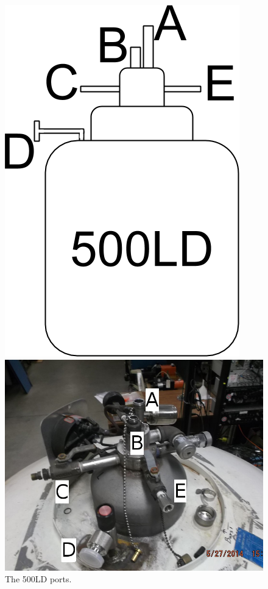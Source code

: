 \begin{figure}[!htbp]
 \centering
 \begin{minipage}{.35\textwidth}
 \includegraphics[width=\textwidth]{./img/500LD-cartoon.png}
 \caption{The 500LD ports.}
 \label{fig:500LD-cartoon}
 \end{minipage}
 \quad
  \begin{minipage}{.50\textwidth}
 \includegraphics[width=\textwidth]{./img/500LD-photo.jpg}

\end{minipage}
\end{figure}

